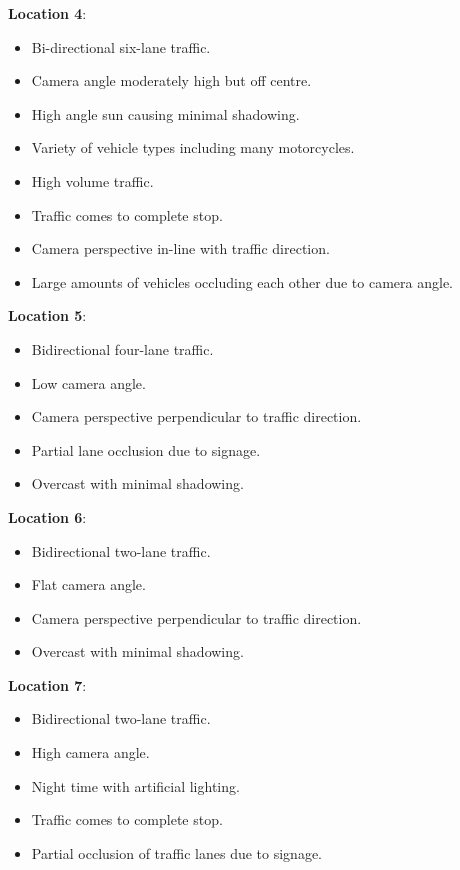 \textbf{Location 4}:

\begin{itemize}
    \item Bi-directional six-lane traffic.
    \item Camera angle moderately high but off centre.
    \item High angle sun causing minimal shadowing.
    \item Variety of vehicle types including many motorcycles.
    \item High volume traffic.
    \item Traffic comes to complete stop.
    \item Camera perspective in-line with traffic direction.
    \item Large amounts of vehicles occluding each other due to camera angle.
\end{itemize}


\textbf{Location 5}:

\begin{itemize}
    \item Bidirectional four-lane traffic.
    \item Low camera angle.
    \item Camera perspective perpendicular to traffic direction.
    \item Partial lane occlusion due to signage.
    \item Overcast with minimal shadowing.
\end{itemize}


\textbf{Location 6}:

\begin{itemize}
    \item Bidirectional two-lane traffic.
    \item Flat camera angle.
    \item Camera perspective perpendicular to traffic direction.
    \item Overcast with minimal shadowing.
\end{itemize}

\textbf{Location 7}:

\begin{itemize}
    \item Bidirectional two-lane traffic.
    \item High camera angle.
    \item Night time with artificial lighting.
    \item Traffic comes to complete stop.
    \item Partial occlusion of traffic lanes due to signage.
\end{itemize}


